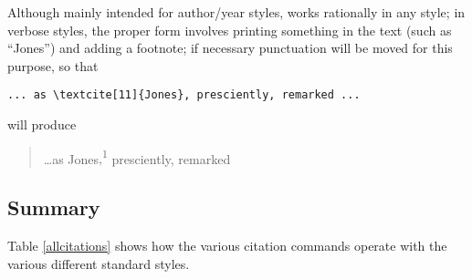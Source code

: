 Although mainly intended for author/year styles,  works
rationally in any style; in verbose styles, the proper form involves
printing something in the text (such as ``Jones'') and adding a
footnote; if necessary punctuation will be moved for this purpose, so
that
\begin{Verbatim}
... as \textcite[11]{Jones}, presciently, remarked ...
\end{Verbatim}
will produce 
\begin{quote}
  \dots as
  Jones\colorbox{red!30}{,\textsuperscript{1}}
  presciently, remarked
\end{quote}

\subsection{Summary}

Table \ref{allcitations} shows how the various citation commands
operate with the various different standard styles.

